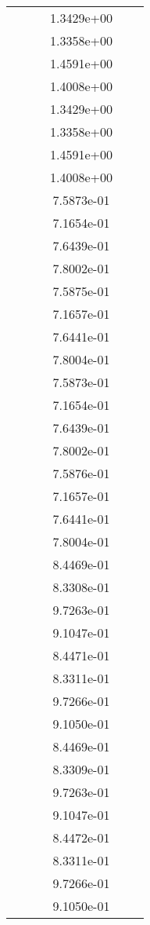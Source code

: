 \begin{xltabular}{\textwidth}{r|rS[table-format=1.3e+2]S[table-format=1.4e+2]S[table-format=1.4e+2]S[table-format=-1.5]}
&  &  & 1.3429e+00 & & \\
&  &  & 1.3358e+00 & & \\
&  &  & 1.4591e+00 & & \\
&  &  & 1.4008e+00 & & \\
&  &  & 1.3429e+00 & & \\
&  &  & 1.3358e+00 & & \\
&  &  & 1.4591e+00 & & \\
&  &  & 1.4008e+00 & & \\
&  &  & 7.5873e-01 & & \\
&  &  & 7.1654e-01 & & \\
&  &  & 7.6439e-01 & & \\
&  &  & 7.8002e-01 & & \\
&  &  & 7.5875e-01 & & \\
&  &  & 7.1657e-01 & & \\
&  &  & 7.6441e-01 & & \\
&  &  & 7.8004e-01 & & \\
&  &  & 7.5873e-01 & & \\
&  &  & 7.1654e-01 & & \\
&  &  & 7.6439e-01 & & \\
&  &  & 7.8002e-01 & & \\
&  &  & 7.5876e-01 & & \\
&  &  & 7.1657e-01 & & \\
&  &  & 7.6441e-01 & & \\
&  &  & 7.8004e-01 & & \\
&  &  & 8.4469e-01 & & \\
&  &  & 8.3308e-01 & & \\
&  &  & 9.7263e-01 & & \\
&  &  & 9.1047e-01 & & \\
&  &  & 8.4471e-01 & & \\
&  &  & 8.3311e-01 & & \\
&  &  & 9.7266e-01 & & \\
&  &  & 9.1050e-01 & & \\
&  &  & 8.4469e-01 & & \\
&  &  & 8.3309e-01 & & \\
&  &  & 9.7263e-01 & & \\
&  &  & 9.1047e-01 & & \\
&  &  & 8.4472e-01 & & \\
&  &  & 8.3311e-01 & & \\
&  &  & 9.7266e-01 & & \\
&  &  & 9.1050e-01 & & \\

\end{xltabular}
